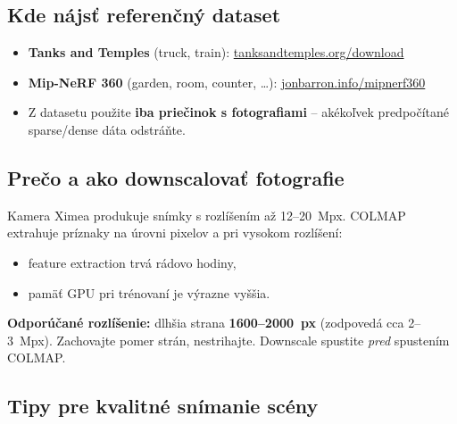 \documentclass{article}
\begin{document}
\subsection*{Kde nájsť referenčný dataset}

\begin{itemize}
    \item \textbf{Tanks and Temples} (truck, train):
          \href{https://www.tanksandtemples.org/download/}{tanksandtemples.org/download}
    \item \textbf{Mip-NeRF 360} (garden, room, counter, \ldots):
          \href{https://jonbarron.info/mipnerf360/}{jonbarron.info/mipnerf360}
    \item Z datasetu použite \textbf{iba priečinok s fotografiami} –
          akékoľvek predpočítané sparse/dense dáta odstráňte.
\end{itemize}

\subsection*{Prečo a ako downscalovať fotografie}

Kamera Ximea produkuje snímky s rozlíšením až 12–20~Mpx.
COLMAP extrahuje príznaky na úrovni pixelov a pri vysokom rozlíšení:
\begin{itemize}
    \item feature extraction trvá rádovo hodiny,
    \item pamäť GPU pri trénovaní je výrazne vyššia.
\end{itemize}
\textbf{Odporúčané rozlíšenie:} dlhšia strana \textbf{1600–2000~px}
(zodpovedá cca 2–3~Mpx).
Zachovajte pomer strán, nestrihajte.
Downscale spustite \emph{pred} spustením COLMAP.

\subsection*{Tipy pre kvalitné snímanie scény}
\end{document}
